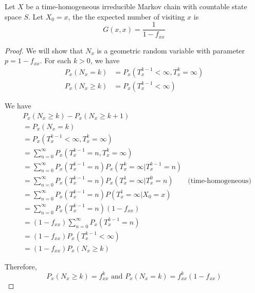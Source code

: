 \documentclass{report}
\begin{document}
\begin{proposition}
    Let $X$ be a time-homogeneous irreducible Markov chain with countable state space $S$. Let $X_0 = x$, the the expected number of visiting $x$ is
    $$
        G(x, x) = \frac{1}{1 - f_{xx}}
    $$
\begin{proof}
    We will show that $N_x$ is a geometric random variable with parameter $p = 1 - f_{xx}$. For each $k > 0$, we have
    \begin{align*}
        P_x(N_x = k) &= P_x(T_x^{k-1} < \infty, T_x^k = \infty) \\
        P_x(N_x \geq k) &= P_x(T_x^{k-1} < \infty)
    \end{align*}

    We have
    \begin{align*}
        &P_x(N_x \geq k) - P_x(N_x \geq k+1) \\
        &= P_x(N_x = k) \\
        &= P_x(T_x^{k-1} < \infty, T_x^k = \infty) \\
        &= \sum_{n=0}^\infty P_x(T_x^{k-1} = n, T_x^k = \infty) \\
        &= \sum_{n=0}^\infty P_x(T_x^{k-1} = n) P_x(T_x^k = \infty| T_x^{k-1} = n) \\
        &= \sum_{n=0}^\infty P_x(T_x^{k-1} = n) P_x(T_x^1 = \infty| T_x^0 = n) &\text{(time-homogeneous)} \\
        &= \sum_{n=0}^\infty P_x(T_x^{k-1} = n) P(T_x^1 = \infty| X_0 = x) \\
        &= \sum_{n=0}^\infty P_x(T_x^{k-1} = n) (1 - f_{xx}) \\
        &= (1 - f_{xx}) \sum_{n=0}^\infty P_x(T_x^{k-1} = n) \\
        &= (1 - f_{xx}) P_x(T_x^{k-1} < \infty) \\
        &= (1 - f_{xx}) P_x(N_x \geq k)
    \end{align*}

    Therefore,
    $$
        P_x(N_x \geq k) = f_{xx}^k \text{ and } P_x(N_x = k) = f_{xx}^k (1 - f_{xx})
    $$
\end{proof}
\end{proposition}
\end{document}
